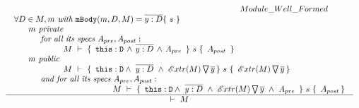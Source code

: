 $
\\ \\
\begin{array}{l}
\inferruleSD {  ~ \strut \hspace{3cm} {\sc{Module\_Well\_Formed}}}
{
\begin{array}{l} 
\forall  D\in M,  m   \textit{ with } \prg{mBody}(m,D,M)=\overline{y:D}\{\  s \ \}      \\
        ~ \strut \hspace{0.5cm} m \textit{ private}  \\ 
            ~ \strut \hspace{0.9cm} \textit{ for all its  specs } A_{pre},  A_{post}:\\ 
             ~\strut \hspace{2cm}
 					   {\hproves{M} { \ \prg{this}:\prg{D}\, \wedge\, \overline{y:D}\, \wedge\, A_{pre}\  } {\ s\ } {\ A_{post} \ } }\\
      ~ \strut \hspace{0.5cm} m \textit{ public}  \\ 
           ~ \strut \hspace{2cm}  { \hproves {M} {\ \prg{this}:\prg{D} \wedge\ \overline{y:D}   \ \wedge \ \PushAS {y} {\extract{M} } } {\ s\ } {\ \PushAS {y}{\extract{M}} } } \\
        ~ \strut \hspace{0.9cm} \textit{ and for all its  specs } A_{pre},  A_{post}:\\ 
             ~\strut \hspace{2cm}   
              ~ \strut \hspace{2cm}  { \hproves {M} {\ \prg{this}:\prg{D} \wedge\ \overline{y:D}  \ \wedge \ \PushAS {y} {\extract{M} } \ \wedge \ A_{pre}\ } {\ s\ } {\ A_{post} }  }
\end{array}
}					  					  
{   
	\ \vdash\ M \ 
}
\end{array}
$



